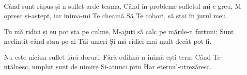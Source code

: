 \beginverse
Când sunt răpus și-n suflet arde teama,
Când în probleme sufletul mi-e greu,
M-opresc și-aștept, iar inima-mi Te cheamă
Să Te cobori, să stai în jurul meu.
\endverse

\beginchorus
Tu mă ridici și eu pot sta pe culme,
M-ajuți să calc pe mările-n furtuni;
Sunt neclintit când stau pe-ai Tăi umeri
Și mă ridici mai mult decât pot fi.
\endchorus

\beginverse
Nu este niciun suflet fără doruri,
Fără odihnă-n inimă ești tern;
Când Te-ntâlnesc, umplut sunt de uimire
Și-atunci prin Har eternu'-ntrezăresc.
\endverse
\endsong